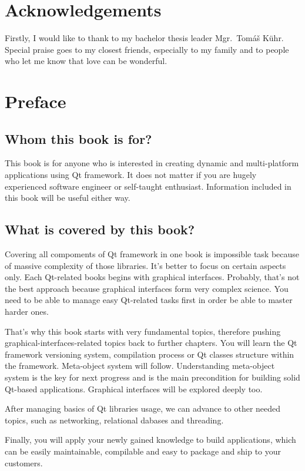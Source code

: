 \section*{Acknowledgements}
Firstly, I would like to thank to my bachelor thesis leader Mgr.~Tomáš Kühr. Special praise goes to my closest friends, especially to my family and to people who let me know that love can be wonderful.

\clearpage

\section*{Preface}

\subsection*{Whom this book is for?}
This book is for anyone who is interested in creating dynamic and multi-platform applications using Qt framework. It does not matter if you are hugely experienced software engineer or self-taught enthusiast. Information included in this book will be useful either way.

\subsection*{What is covered by this book?}
Covering all compoments of Qt framework in one book is impossible task because of massive complexity of those libraries. It's better to focus on certain aspects only. Each Qt-related books begins with graphical interfaces. Probably, that's not the best approach because graphical interfaces form very complex science. You need to be able to manage easy Qt-related tasks first in order be able to master harder ones.

That's why this book starts with very fundamental topics, therefore pushing graphical-interfaces-related topics back to further chapters. You will learn the Qt framework versioning system, compilation process or Qt classes structure within the framework. Meta-object system will follow. Understanding meta-object system is the key for next progress and is the main precondition for building solid Qt-based applications. Graphical interfaces will be explored deeply too.

After managing basics of Qt libraries usage, we can advance to other needed topics, such as networking, relational dabases and threading.

Finally, you will apply your newly gained knowledge to build applications, which can be easily maintainable, compilable and easy to package and ship to your customers.

